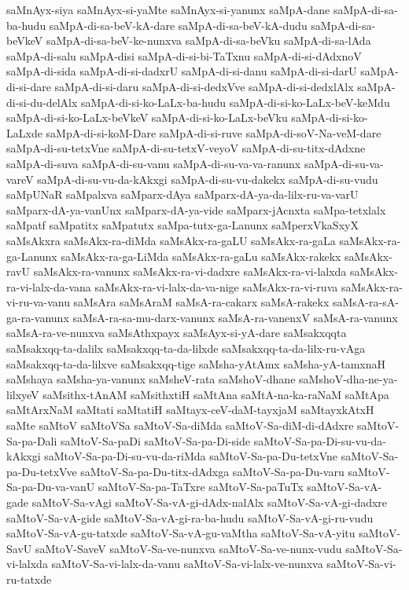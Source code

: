 {saMnAyx-siya
saMnAyx-si-yaMte
saMnAyx-si-yanunx
saMpA-dane
saMpA-di-sa-ba-hudu
saMpA-di-sa-beV-kA-dare
saMpA-di-sa-beV-kA-dudu
saMpA-di-sa-beVkeV
saMpA-di-sa-beV-ke-nunxva
saMpA-di-sa-beVku
saMpA-di-sa-lAda
saMpA-di-salu
saMpA-disi
saMpA-di-si-bi-TaTxnu
saMpA-di-si-dAdxnoV
saMpA-di-sida
saMpA-di-si-dadxrU
saMpA-di-si-danu
saMpA-di-si-darU
saMpA-di-si-dare
saMpA-di-si-daru
saMpA-di-si-dedxVve
saMpA-di-si-dedxlAlx
saMpA-di-si-du-delAlx
saMpA-di-si-ko-LaLx-ba-hudu
saMpA-di-si-ko-LaLx-beV-keMdu
saMpA-di-si-ko-LaLx-beVkeV
saMpA-di-si-ko-LaLx-beVku
saMpA-di-si-ko-LaLxde
saMpA-di-si-koM-Dare
saMpA-di-si-ruve
saMpA-di-soV-Na-veM-dare
saMpA-di-su-tetxVne
saMpA-di-su-tetxV-veyoV
saMpA-di-su-titx-dAdxne
saMpA-di-suva
saMpA-di-su-vanu
saMpA-di-su-va-va-ranunx
saMpA-di-su-va-vareV
saMpA-di-su-vu-da-kAkxgi
saMpA-di-su-vu-dakekx
saMpA-di-su-vudu
saMpUNaR
saMpalxva
saMparx-dAya
saMparx-dA-ya-da-lilx-ru-va-varU
saMparx-dA-ya-vanUnx
saMparx-dA-ya-vide
saMparx-jAcnxta
saMpa-tetxlalx
saMpatf
saMpatitx
saMpatutx
saMpa-tutx-ga-Lanunx
saMperxVkaSxyX
saMsAkxra
saMsAkx-ra-diMda
saMsAkx-ra-gaLU
saMsAkx-ra-gaLa
saMsAkx-ra-ga-Lanunx
saMsAkx-ra-ga-LiMda
saMsAkx-ra-gaLu
saMsAkx-rakekx
saMsAkx-ravU
saMsAkx-ra-vanunx
saMsAkx-ra-vi-dadxre
saMsAkx-ra-vi-lalxda
saMsAkx-ra-vi-lalx-da-vana
saMsAkx-ra-vi-lalx-da-va-nige
saMsAkx-ra-vi-ruva
saMsAkx-ra-vi-ru-va-vanu
saMsAra
saMsAraM
saMsA-ra-cakarx
saMsA-rakekx
saMsA-ra-sA-ga-ra-vanunx
saMsA-ra-sa-mu-darx-vanunx
saMsA-ra-vanenxV
saMsA-ra-vanunx
saMsA-ra-ve-nunxva
saMsAthxpayx
saMsAyx-si-yA-dare
saMsakxqqta
saMsakxqq-ta-dalilx
saMsakxqq-ta-da-lilxde
saMsakxqq-ta-da-lilx-ru-vAga
saMsakxqq-ta-da-lilxve
saMsakxqq-tige
saMsha-yAtAmx
saMsha-yA-tamxnaH
saMshaya
saMsha-ya-vanunx
saMsheV-rata
saMshoV-dhane
saMshoV-dha-ne-ya-lilxyeV
saMsithx-tAnAM
saMsithxtiH
saMtAna
saMtA-na-ka-raNaM
saMtApa
saMtArxNaM
saMtati
saMtatiH
saMtayx-ceV-daM-tayxjaM
saMtayxkAtxH
saMte
saMtoV
saMtoVSa
saMtoV-Sa-diMda
saMtoV-Sa-diM-di-dAdxre
saMtoV-Sa-pa-Dali
saMtoV-Sa-paDi
saMtoV-Sa-pa-Di-side
saMtoV-Sa-pa-Di-su-vu-da-kAkxgi
saMtoV-Sa-pa-Di-su-vu-da-riMda
saMtoV-Sa-pa-Du-tetxVne
saMtoV-Sa-pa-Du-tetxVve
saMtoV-Sa-pa-Du-titx-dAdxga
saMtoV-Sa-pa-Du-varu
saMtoV-Sa-pa-Du-va-vanU
saMtoV-Sa-pa-TaTxre
saMtoV-Sa-paTuTx
saMtoV-Sa-vA-gade
saMtoV-Sa-vAgi
saMtoV-Sa-vA-gi-dAdx-nalAlx
saMtoV-Sa-vA-gi-dadxre
saMtoV-Sa-vA-gide
saMtoV-Sa-vA-gi-ra-ba-hudu
saMtoV-Sa-vA-gi-ru-vudu
saMtoV-Sa-vA-gu-tatxde
saMtoV-Sa-vA-gu-vaMtha
saMtoV-Sa-vA-yitu
saMtoV-SavU
saMtoV-SaveV
saMtoV-Sa-ve-nunxva
saMtoV-Sa-ve-nunx-vudu
saMtoV-Sa-vi-lalxda
saMtoV-Sa-vi-lalx-da-vanu
saMtoV-Sa-vi-lalx-ve-nunxva
saMtoV-Sa-vi-ru-tatxde
}
